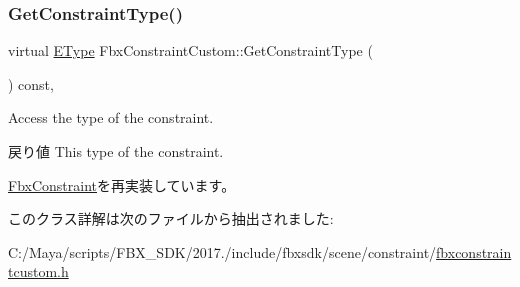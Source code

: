 \subsubsection{\texorpdfstring{Get\+Constraint\+Type()}{GetConstraintType()}}
{\footnotesize\ttfamily virtual \hyperlink{class_fbx_constraint_a49c1634663395eab7c28856df233ec66}{E\+Type} Fbx\+Constraint\+Custom\+::\+Get\+Constraint\+Type (\begin{DoxyParamCaption}{ }\end{DoxyParamCaption}) const\hspace{0.3cm}{\ttfamily [protected]}, {\ttfamily [virtual]}}

Access the type of the constraint. \begin{DoxyReturn}{戻り値}
This type of the constraint. 
\end{DoxyReturn}


\hyperlink{class_fbx_constraint_adbeea66a1a605531a019aa6df90dc45b}{Fbx\+Constraint}を再実装しています。



このクラス詳解は次のファイルから抽出されました\+:\begin{DoxyCompactItemize}
\item 
C\+:/\+Maya/scripts/\+F\+B\+X\+\_\+\+S\+D\+K/2017./include/fbxsdk/scene/constraint/\hyperlink{fbxconstraintcustom_8h}{fbxconstraintcustom.\+h}\end{DoxyCompactItemize}
